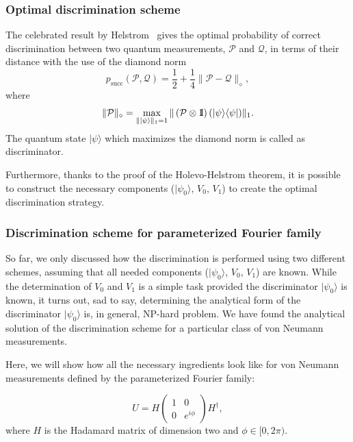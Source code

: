 \documentclass[preprint,12pt, a4paper]{elsarticle}
\newcommand{\ket}[1]{\ensuremath{|#1\rangle}}
\newcommand{\bra}[1]{\ensuremath{\langle#1|}}
\newcommand{\ketbra}[2]{\ensuremath{\ket{#1}\bra{#2}}}
\newcommand{\proj}[1]{\ensuremath{\ketbra{#1}{#1}}}
\newcommand{\1}{{\rm 1\hspace{-0.9mm}l}}
\newcommand{\PP}{\mathcal{P}}
\begin{document}
\subsubsection{Optimal discrimination scheme}


The celebrated result by Helstrom~\cite{helstrom1976quantum} gives the optimal  probability of correct discrimination between two quantum measurements, $\PP$  and $\mathcal{Q}$,
in terms of their distance with the use of the diamond norm
\begin{equation}
p_{\text{succ}}(\PP, \mathcal{Q}) =  \frac12 + \frac14 \| \PP - \mathcal{Q} \|_\diamond, 
\end{equation}
where 
\begin{equation}
\|\PP\|_\diamond = \max_{\| \ket{\psi}\|_1=1} \| \left(\PP \otimes \1\right) (\proj{\psi}) \|_1.
\end{equation}
The quantum state $\ket{\psi}$ which maximizes the diamond norm is called as discriminator.

Furthermore,  thanks to the proof of the Holevo-Helstrom theorem, it is possible to construct the necessary components  ($\ket{\psi_0}$, $V_0$, $V_1$) to create the optimal discrimination strategy. 

 


\subsubsection{Discrimination scheme for parameterized Fourier family}

So far, we only discussed how the discrimination is performed using two different
schemes, assuming that all needed components ($\ket{\psi_0}$, $V_0$, $V_1$) are known. While the determination of $V_0$ and $V_1$ is a simple task provided the discriminator $\ket{\psi_{0}}$ is known, it turns out, 
sad to say, determining the analytical form of the discriminator $\ket{\psi_{0}}$
is, in general, NP-hard problem. 
We have found the analytical solution of the discrimination scheme for a particular class of von Neumann measurements.  


Here,  we will show how all the necessary ingredients look like for
von Neumann measurements defined by the parameterized Fourier family:

\begin{equation}
	U = H
	\left(\begin{array}{cc}1&0\\0&e^{i \phi}\end{array}\right)  H^\dagger, 
\end{equation}
where $H$ is the Hadamard matrix of dimension two and $\phi \in [0, 2 \pi)$.
\end{document}
